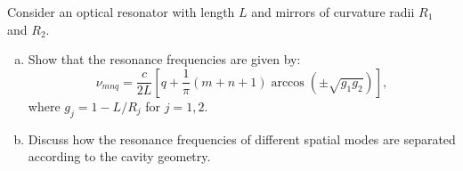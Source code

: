 %

\begin{exercicio}
Consider an optical resonator with length $L$ and mirrors of curvature radii $R_{1}$ and $R_{2}$.

\begin{enumerate}[a)]
    \item Show that the resonance frequencies are given by:
    \[
    \nu_{mnq} = \frac{c}{2L} \left[ q + \frac{1}{\pi} (m+n+1) \arccos\left(\pm\sqrt{g_{1}g_{2}}\right) \right],
    \]
    where $g_{j} = 1 - L/R_{j}$ for $j=1,2$.
    \item Discuss how the resonance frequencies of different spatial modes are separated according to the cavity geometry.
\end{enumerate}
\end{exercicio}

